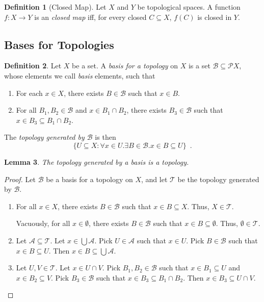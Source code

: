 \documentclass{book}
\newtheorem{lm}{Lemma}[chapter]
\theoremstyle{definition}
\newtheorem{df}[lm]{Definition}
\begin{document}
  \begin{df}[Closed Map]
    Let $X$ and $Y$ be topological spaces. A function $f : X \rightarrow Y$ is 
    an 
    \emph{closed map} iff, for every closed $C \subseteq X$, $f(C)$ is closed 
    in 
    $Y$.
  \end{df}
  
  \subsection{Bases for Topologies}
  
  \begin{df}
    Let $X$ be a set. A \emph{basis for a topology} on $X$ is a set $\mathcal{B}
    \subseteq \mathcal{P} X$, whose elements we call \emph{basis} elements, such
    that
    \begin{enumerate}
      \item For each $x \in X$, there exists $B \in \mathcal{B}$ such that $x 
      \in B$.
      \item For all $B_1, B_2 \in \mathcal{B}$ and $x \in B_1 \cap B_2$, there
      exists $B_3 \in \mathcal{B}$ such that $x \in B_3 \subseteq B_1 \cap B_2$.
    \end{enumerate}
    
    The \emph{topology generated by $\mathcal{B}$} is then
    \[ \{ U \subseteq X : \forall x \in U. \exists B \in \mathcal{B}. x \in B
    \subseteq U \} \enspace . \]
  \end{df}
  
  \begin{lm}
    The topology generated by a basis is a topology.
  \end{lm}
  
  \begin{proof}
    Let $\mathcal{B}$ be a basis for a topology on $X$, and let $\mathcal{T}$ be
    the topology generated by $\mathcal{B}$.
    \begin{enumerate}
      \item For all $x \in X$, there exists $B \in \mathcal{B}$ such that $x \in 
      B
      \subseteq X$. Thus, $X \in \mathcal{T}$.
      
      Vacuously, for all $x \in \emptyset$, there exists $B \in \mathcal{B}$ 
      such
      that $x \in B \subseteq \emptyset$. Thus, $\emptyset \in \mathcal{T}$.
      \item Let $\mathcal{A} \subseteq \mathcal{T}$. Let $x \in \bigcup 
      \mathcal{A}$.
      Pick $U \in \mathcal{A}$ such that $x \in U$. Pick $B \in \mathcal{B}$ 
      such
      that $x \in B \subseteq U$. Then $x \in B \subseteq \bigcup \mathcal{A}$.
      \item Let $U, V \in \mathcal{T}$. Let $x \in U \cap V$. Pick $B_1, B_2 \in
      \mathcal{B}$ such that $x \in B_1 \subseteq U$ and $x \in B_2 \subseteq 
      V$.
      Pick $B_3 \in \mathcal{B}$ such that $x \in B_3 \subseteq B_1 \cap B_2$. 
      Then
      $x \in B_3 \subseteq U \cap V$.
    \end{enumerate}
  \end{proof}
  
\end{document}
